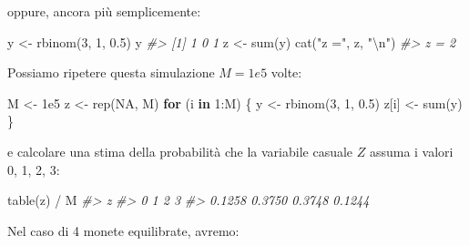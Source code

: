 \documentclass[
  11pt,
]{krantz}
\makeatletter
\newenvironment{Shaded}{\begin{snugshade}}{\end{snugshade}}
\newcommand{\CommentTok}[1]{\textcolor[rgb]{0.37,0.37,0.37}{\textit{#1}}}
\newcommand{\ConstantTok}[1]{\textcolor[rgb]{0,0,0}{#1}}
\newcommand{\ControlFlowTok}[1]{\textcolor[rgb]{0.27,0.27,0.27}{\textbf{#1}}}
\newcommand{\DecValTok}[1]{\textcolor[rgb]{0.06,0.06,0.06}{#1}}
\newcommand{\FloatTok}[1]{\textcolor[rgb]{0.06,0.06,0.06}{#1}}
\newcommand{\FunctionTok}[1]{\textcolor[rgb]{0,0,0}{#1}}
\newcommand{\NormalTok}[1]{#1}
\newcommand{\OtherTok}[1]{\textcolor[rgb]{0.37,0.37,0.37}{#1}}
\newcommand{\SpecialCharTok}[1]{\textcolor[rgb]{0,0,0}{#1}}
\newcommand{\StringTok}[1]{\textcolor[rgb]{0.5,0.5,0.5}{#1}}
\newenvironment{kframe}{%
\medskip{}
\setlength{\fboxsep}{.8em}
 \def\at@end@of@kframe{}%
 \ifinner\ifhmode%
  \def\at@end@of@kframe{\end{minipage}}%
  \begin{minipage}{\columnwidth}%
 \fi\fi%
 \def\FrameCommand##1{\hskip\@totalleftmargin \hskip-\fboxsep
 \colorbox{shadecolor}{##1}\hskip-\fboxsep
     \hskip-\linewidth \hskip-\@totalleftmargin \hskip\columnwidth}%
 \MakeFramed {\advance\hsize-\width
   \@totalleftmargin\z@ \linewidth\hsize
   \@setminipage}}%
 {\par\unskip\endMakeFramed%
 \at@end@of@kframe}
\renewenvironment{Shaded}{\begin{kframe}}{\end{kframe}}
\theoremstyle{definition}
\theoremstyle{definition}
\theoremstyle{definition}
\theoremstyle{definition}
\theoremstyle{remark}
\makeatother
\begin{document}
oppure, ancora più semplicemente:

\begin{Shaded}
\begin{Highlighting}[]
\NormalTok{y }\OtherTok{\textless{}{-}} \FunctionTok{rbinom}\NormalTok{(}\DecValTok{3}\NormalTok{, }\DecValTok{1}\NormalTok{, }\FloatTok{0.5}\NormalTok{)}
\NormalTok{y}
\CommentTok{\#\textgreater{} [1] 1 0 1}
\NormalTok{z }\OtherTok{\textless{}{-}} \FunctionTok{sum}\NormalTok{(y)}
\FunctionTok{cat}\NormalTok{(}\StringTok{"z ="}\NormalTok{, z, }\StringTok{"}\SpecialCharTok{\textbackslash{}n}\StringTok{"}\NormalTok{)}
\CommentTok{\#\textgreater{} z = 2}
\end{Highlighting}
\end{Shaded}

Possiamo ripetere questa simulazione \(M = 1e5\) volte:

\begin{Shaded}
\begin{Highlighting}[]
\NormalTok{M }\OtherTok{\textless{}{-}} \FloatTok{1e5}
\NormalTok{z }\OtherTok{\textless{}{-}} \FunctionTok{rep}\NormalTok{(}\ConstantTok{NA}\NormalTok{, M)}
\ControlFlowTok{for}\NormalTok{ (i }\ControlFlowTok{in} \DecValTok{1}\SpecialCharTok{:}\NormalTok{M) \{}
\NormalTok{  y }\OtherTok{\textless{}{-}} \FunctionTok{rbinom}\NormalTok{(}\DecValTok{3}\NormalTok{, }\DecValTok{1}\NormalTok{, }\FloatTok{0.5}\NormalTok{)}
\NormalTok{  z[i] }\OtherTok{\textless{}{-}} \FunctionTok{sum}\NormalTok{(y)}
\NormalTok{\}}
\end{Highlighting}
\end{Shaded}

e calcolare una stima della probabilità che la variabile casuale \(Z\) assuma i valori 0, 1, 2, 3:

\begin{Shaded}
\begin{Highlighting}[]
\FunctionTok{table}\NormalTok{(z) }\SpecialCharTok{/}\NormalTok{ M}
\CommentTok{\#\textgreater{} z}
\CommentTok{\#\textgreater{}      0      1      2      3 }
\CommentTok{\#\textgreater{} 0.1258 0.3750 0.3748 0.1244}
\end{Highlighting}
\end{Shaded}

Nel caso di 4 monete equilibrate, avremo:
\end{document}
